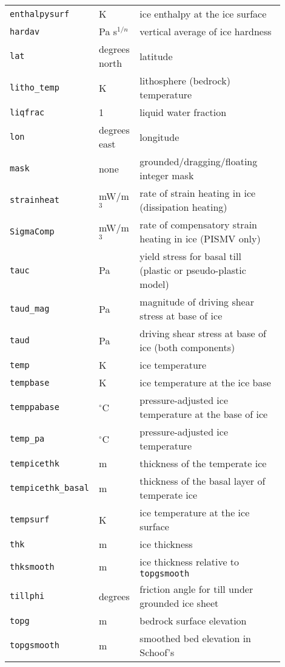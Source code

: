 \begin{center}
\begin{xtabular}{p{0.15\linewidth}p{0.15\linewidth}p{0.6\linewidth}}
    \texttt{enthalpysurf} & K & ice enthalpy at the ice surface\\
    \texttt{hardav} & Pa s$^{1/n}$ & vertical average of ice hardness \\
    \texttt{lat} & degrees north& latitude \\
    \texttt{litho_temp} & K & lithosphere (bedrock) temperature\\
    \texttt{liqfrac} & 1 & liquid water fraction \\
    \texttt{lon} & degrees east & longitude \\
    \texttt{mask} & none & grounded/dragging/floating integer mask \\
    \texttt{strainheat} & mW/m$^{3}$ & rate of strain heating in ice (dissipation heating) \\
    \texttt{SigmaComp} & mW/m$^{3}$ & rate of compensatory strain heating in ice (PISMV only)\\
    \texttt{tauc} & Pa & yield stress for basal till (plastic or pseudo-plastic model) \\
    \texttt{taud_mag} & Pa & magnitude of driving shear stress at base of ice \\
    \texttt{taud} & Pa & driving shear stress at base of ice (both components)\\
    \texttt{temp} & K & ice temperature \\
    \texttt{tempbase} & K & ice temperature at the ice base\\
    \texttt{temppabase} & $^{\circ}$C & pressure-adjusted ice temperature at the base of ice\\
    \texttt{temp_pa} & $^{\circ}$C & pressure-adjusted ice temperature \\
    \texttt{tempicethk} & m & thickness of the temperate ice \\
    \scriptsize \texttt{tempicethk_basal}\normalsize & m & thickness of the basal layer of temperate ice \\
    \texttt{tempsurf} & K & ice temperature at the ice surface\\
    \texttt{thk} & m & ice thickness\\
    \texttt{thksmooth} & m & ice thickness relative to \texttt{topgsmooth} \\
    \texttt{tillphi} & degrees & friction angle for till under grounded ice sheet \\
    \texttt{topg} & m & bedrock surface elevation \\
    \texttt{topgsmooth} & m & smoothed bed elevation in Schoof's

\end{xtabular}
\end{center}
